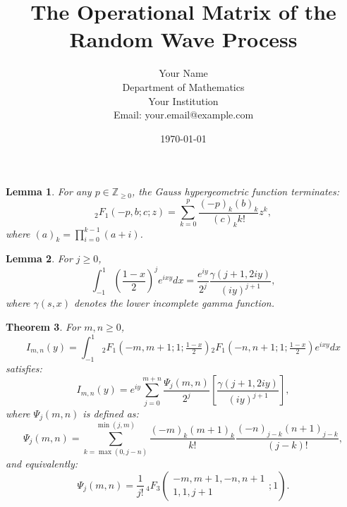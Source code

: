 \documentclass[12pt]{article}
\title{The Operational Matrix of the Random Wave Process}
\author{Your Name \\ Department of Mathematics \\ Your Institution \\ Email: your.email@example.com}
\date{\today}
\newtheorem{theorem}{Theorem}
\newtheorem{lemma}[theorem]{Lemma}
\begin{document}
\maketitle

\begin{lemma}\label{lem:HyperExpansions}
For any \( p \in \mathbb{Z}_{\geq 0} \), the Gauss hypergeometric function terminates:
\[
{}_2F_1(-p, b; c; z) = \sum_{k=0}^p \frac{(-p)_k (b)_k}{(c)_k k!} z^k,
\]
where \((a)_k = \prod_{i=0}^{k-1}(a+i)\).
\end{lemma}

\begin{lemma}\label{lem:IntegralGamma}
For \( j \geq 0 \), 
\[
\int_{-1}^1 \left(\frac{1-x}{2}\right)^j e^{ixy}dx = \frac{e^{iy}}{2^j}\frac{\gamma(j+1,2iy)}{(iy)^{j+1}},
\]
where \(\gamma(s, x)\) denotes the lower incomplete gamma function.
\end{lemma}

\begin{theorem}\label{thm:MainResult}
For \( m,n \geq 0 \),
\[
I_{m,n}(y) = \int_{-1}^1 {}_2F_1\left(-m,m+1;1;\tfrac{1-x}{2}\right){}_2F_1\left(-n,n+1;1;\tfrac{1-x}{2}\right)e^{ixy}dx
\]
satisfies:
\[
I_{m,n}(y) = e^{iy}\sum_{j=0}^{m+n}\frac{\Psi_j(m,n)}{2^j}\left[\frac{\gamma(j+1,2iy)}{(iy)^{j+1}}\right],
\]
where \( \Psi_j(m,n) \) is defined as:
\[
\Psi_j(m,n) = \sum_{k=\max(0,j-n)}^{\min(j,m)} \frac{(-m)_k(m+1)_k}{k!}\frac{(-n)_{j-k}(n+1)_{j-k}}{(j-k)!},
\]
and equivalently:
\[
\Psi_j(m,n) = \frac{1}{j!}\,{}_4F_3\left(\begin{array}{c} -m, m+1, -n, n+1 \\ 1, 1, j+1 \end{array};1\right).
\]
\end{theorem}
\end{document}
